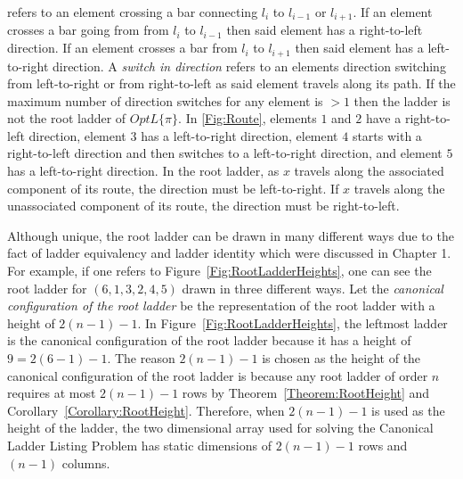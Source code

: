 refers to an element crossing a bar connecting $l_{i}$ to $l_{i-1}$ or $l_{i+1}$. If an element crosses a bar going from 
from $l_{i}$ to $l_{i-1}$ then said element has a right-to-left direction. If an element crosses a bar 
from $l_{i}$ to $l_{i+1}$ then said element has a left-to-right direction. A \emph{switch in direction} refers 
to an elements direction switching from left-to-right or from right-to-left as said element travels 
along its path. If the maximum 
number of direction switches for any element is $>1$ then the ladder is not the root ladder of $OptL\{\pi\}$.  
In \ref{Fig:Route}, elements $1$ and $2$ have a right-to-left direction, element $3$ has a left-to-right direction, 
element $4$ starts with a right-to-left direction and then switches to a left-to-right direction, and element $5$ has a left-to-right direction. 
In the root ladder, as $x$ travels along the associated component of its route, the direction must be left-to-right. If $x$ travels 
along the unassociated component of its route, the direction must be right-to-left. 


Although unique, the root ladder can be drawn in many different ways due to the fact of ladder equivalency and ladder identity which were discussed in Chapter 1. 
For example, if one refers to Figure~\ref{Fig:RootLadderHeights}, one can see the root ladder for $(6,1,3,2,4,5)$ drawn in three different ways. 
Let the \emph{canonical configuration of the root ladder} be the representation of the root ladder with a height of $2(n-1)-1$. In Figure~\ref{Fig:RootLadderHeights}, 
the leftmost ladder is the canonical configuration of the root ladder because it has a height of $9=2(6-1)-1$. The reason $2(n-1)-1$ is chosen as the 
height of the canonical configuration of the root ladder is because any root ladder of order $n$ requires at most 
$2(n-1)-1$ rows by Theorem~\ref{Theorem:RootHeight} and Corollary~\ref{Corollary:RootHeight}. 
Therefore, when $2(n-1)-1$ is used as the height of the ladder, the two dimensional array used 
for solving the Canonical Ladder Listing Problem has static dimensions of $2(n-1)-1$ rows and $(n-1)$ columns.

